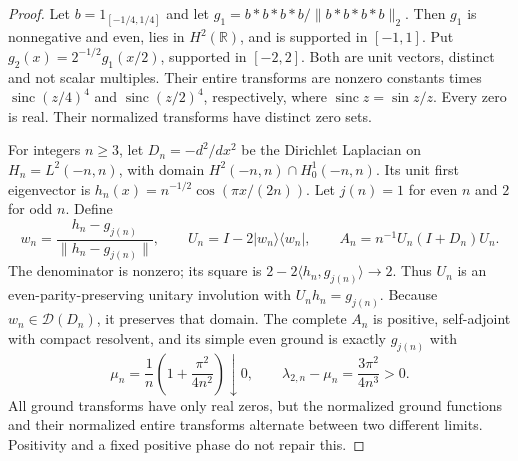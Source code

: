 \documentclass[11pt]{article}
\theoremstyle{remark}
\begin{document}
\begin{proof}
Let $b=1_{[-1/4,1/4]}$ and let $g_1=b*b*b*b/\|b*b*b*b\|_2$.
Then $g_1$ is nonnegative and even, lies in $H^2(\mathbb R)$, and is
supported in $[-1,1]$. Put $g_2(x)=2^{-1/2}g_1(x/2)$, supported in
$[-2,2]$. Both are unit vectors, distinct and not scalar multiples.
Their entire transforms are nonzero constants times
$\operatorname{sinc}(z/4)^4$ and $\operatorname{sinc}(z/2)^4$,
respectively, where $\operatorname{sinc}z=\sin z/z$. Every zero is real.
Their normalized transforms have distinct zero sets.

For integers $n\ge3$, let $D_n=-d^2/dx^2$ be the Dirichlet Laplacian
on $H_n=L^2(-n,n)$, with domain $H^2(-n,n)\cap H_0^1(-n,n)$.
Its unit first eigenvector is
$h_n(x)=n^{-1/2}\cos(\pi x/(2n))$.
Let $j(n)=1$ for even $n$ and $2$ for odd $n$. Define
\[
 w_n=\frac{h_n-g_{j(n)}}{\|h_n-g_{j(n)}\|},\qquad
 U_n=I-2|w_n\rangle\langle w_n|,\qquad
 A_n=n^{-1}U_n(I+D_n)U_n.
\]
The denominator is nonzero; its square is
$2-2\langle h_n,g_{j(n)}\rangle\to2$.
Thus $U_n$ is an even-parity-preserving unitary involution with
$U_nh_n=g_{j(n)}$. Because $w_n\in\mathcal D(D_n)$, it preserves
that domain. The complete $A_n$ is positive, self-adjoint with compact
resolvent, and its simple even ground is exactly $g_{j(n)}$ with
\[
 \mu_n=\frac1n\left(1+\frac{\pi^2}{4n^2}\right)\downarrow0,
 \qquad \lambda_{2,n}-\mu_n=\frac{3\pi^2}{4n^3}>0.
\]
All ground transforms have only real zeros, but the normalized ground
functions and their normalized entire transforms alternate between two
different limits. Positivity and a fixed positive phase do not repair this.


\end{proof}
\end{document}
